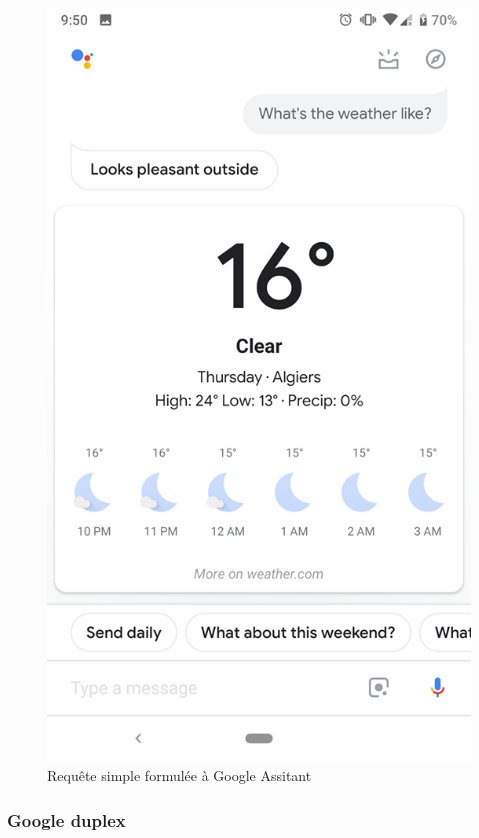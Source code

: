 \begin{figure}[H]
\begin{minipage}[b]{.45\textwidth}
	\end{minipage}
	\hspace{0.5cm}
	\begin{minipage}[b]{.45\textwidth}
		\centering
		\includegraphics[width=.85\linewidth]{images/google_assitant/weather.png} 
		\caption{Requête simple formulée à Google Assitant} 
	\end{minipage}
\end{figure}


\subsubsection{Google duplex}\label{duplex}

